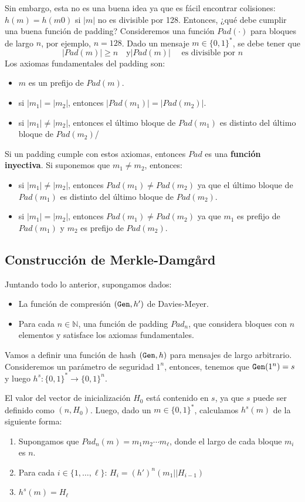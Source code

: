Sin embargo, esta no es una buena idea ya que es fácil encontrar colisiones: $h(m) = h(m0)$ si $|m|$ no es divisible por 128. Entonces, ¿qué debe cumplir una buena función de padding? Consideremos una función $Pad(\cdot)$ para bloques de largo $n$, por ejemplo, $n = 128$. Dado un mensaje $m \in \{0,1\}^*$, se debe tener que
$$
|Pad(m)| \geq n \quad \text{y} |Pad(m)| \quad \text{ es divisible por } n
$$
Los axiomas fundamentales del padding son:
\begin{itemize}
    \item $m$ es un prefijo de $Pad(m)$.
    \item si $|m_1| = |m_2|$, entonces $|Pad(m_1)| = |Pad(m_2)|$.
    \item si $|m_1| \neq |m_2|$, entonces el último bloque de $Pad(m_1)$ es distinto del último bloque de $Pad(m_2)$/
\end{itemize}
Si un padding cumple con estos axiomas, entonces $Pad$ es una \textbf{función inyectiva}. Si suponemos que $m_1 \neq m_2$, entonces:
\begin{itemize}
    \item si $|m_1| \neq |m_2|$, entonces $Pad(m_1) \neq Pad(m_2)$ ya que el último bloque de $Pad(m_1)$ es distinto del último bloque de $Pad(m_2)$.
    \item si $|m_1| = |m_2|$, entonces $Pad(m_1) \neq Pad(m_2)$ ya que $m_1$ es prefijo de $Pad(m_1)$ y $m_2$ es prefijo de $Pad(m_2)$.
\end{itemize}

\subsection{Construcción de Merkle-Damgård}
Juntando todo lo anterior, supongamos dados:
\begin{itemize}
    \item La función de compresión $(\texttt{Gen}, h')$ de Davies-Meyer.
    \item Para cada $n \in \mathbb{N}$, una función de padding $Pad_n$, que considera bloques con $n$ elementos y satisface los axiomas fundamentales.
\end{itemize}
Vamos a definir una función de hash $(\texttt{Gen}, h)$ para mensajes de largo arbitrario. Consideremos un parámetro de seguridad $1^n$, entonces, tenemos que $\texttt{Gen}(1^n) = s$ y luego $h^s:\{0,1\}^* \to \{0,1\}^n$. \medbreak

El valor del vector de inicialización $H_0$ está contenido en $s$, ya que $s$ puede ser definido como $(n, H_0)$. Luego, dado un $m \in \{0,1\}^*$, calculamos $h^s(m)$ de la siguiente forma:
\begin{enumerate}
    \item Supongamos que $Pad_n(m) = m_1 m_2 \cdots m_\ell$, donde el largo de cada bloque $m_i$ es $n$.
    \item Para cada $i \in \{1, \ldots, \ell\}$: $H_i = (h')^n(m_1 || H_{i-1})$
    \item $h^s(m) = H_\ell$
\end{enumerate}

